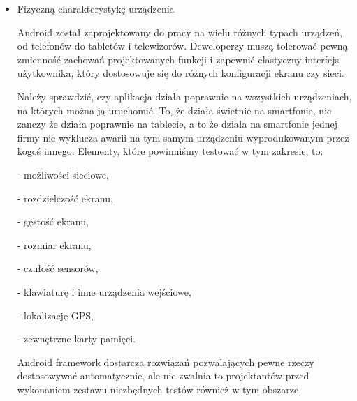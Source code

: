 \begin{itemize}
Według dokumentacji Android\cite{website:android:manual} możliwe są następujące opcje przechowywania danych:

- \textit{Shared Preferences}, czyli zachowywanie podstawowych danych w parach klucz - wartość,

- pamięć wewnętrzna urządzenia - do zachowywania danych niepublicznych,

- zewnętrzna karta pamięci - do zachowywania danych publicznych,

- baza danych SQLite - do przechowywania danych w prywatnej bazie danych,

- zasoby sieciowe - jako baza danych współdzielona pomiędzy urządzeniami.

Wszystkie te opcje korzystają ze wspólnego zestawu funkcji\footnote{Na przykład do obsługi plików używamy \textit{getFileDir(), getDir(), deleteFile()} itp.}, które tester powinien wziąć pod uwagę przy tworzeniu przypadków testowych.

\item{Fizyczną charakterystykę urządzenia}

Android został zaprojektowany do pracy na wielu różnych typach urządzeń, od telefonów do tabletów i telewizorów. Deweloperzy muszą tolerować pewną zmienność zachowań projektowanych funkcji i zapewnić elastyczny interfejs użytkownika, który dostosowuje się do różnych konfiguracji ekranu czy sieci.

Należy sprawdzić, czy aplikacja działa poprawnie na wszystkich urządzeniach, na których można ją uruchomić. To, że działa świetnie na smartfonie, nie zanczy że działa poprawnie na tablecie, a to że działa na smartfonie jednej firmy nie wyklucza awarii na tym samym urządzeniu wyprodukowanym przez kogoś innego. Elementy, które powinniśmy testować w tym zakresie, to:

- możliwości sieciowe,

- rozdzielczość ekranu,

- gęstość ekranu,

- rozmiar ekranu,

- czułość sensorów,

- klawiaturę i inne urządzenia wejściowe,

- lokalizację GPS,

- zewnętrzne karty pamięci.

Android framework dostarcza rozwiązań pozwalających pewne rzeczy dostosowywać automatycznie, ale nie zwalnia to projektantów przed wykonaniem zestawu niezbędnych testów również w tym obszarze.

\end{itemize}

